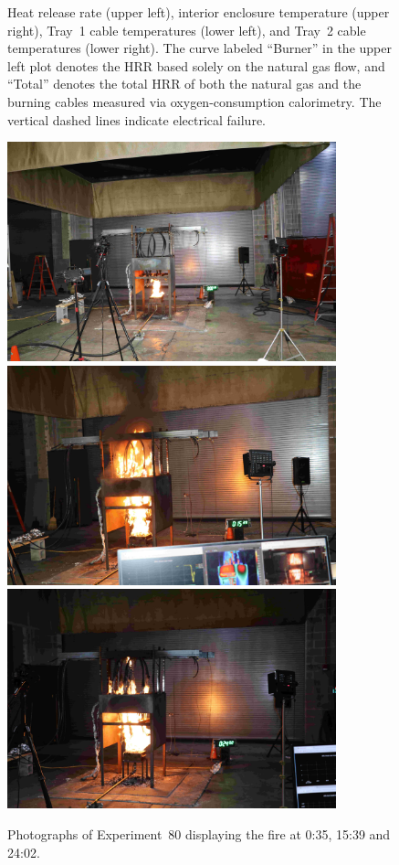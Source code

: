 \begin{figure}[H]
\caption[HRR and temperatures of Experiment 80]{Heat release rate (upper left), interior enclosure temperature (upper right), Tray~1 cable temperatures (lower left), and Tray~2 cable temperatures (lower right). The curve labeled ``Burner'' in the upper left plot denotes the HRR based solely on the natural gas flow, and ``Total'' denotes the total HRR of both the natural gas and the burning cables measured via oxygen-consumption calorimetry. The vertical dashed lines indicate electrical failure.}
\label{fig:Test_80}
\end{figure}

\begin{figure}[p]
\centering
\includegraphics[height=2.50in]{../FIGURES/Test_80_Photo_1} \\ \vspace{0.1in}
\includegraphics[height=2.50in]{../FIGURES/Test_80_Photo_2} \\ \vspace{0.1in}
\includegraphics[height=2.50in]{../FIGURES/Test_80_Photo_3}
\caption[Photographs of Experiment~80]{Photographs of Experiment~80 displaying the fire at 0:35, 15:39 and 24:02.}
\label{fig:Test_80_photos}
\end{figure}


